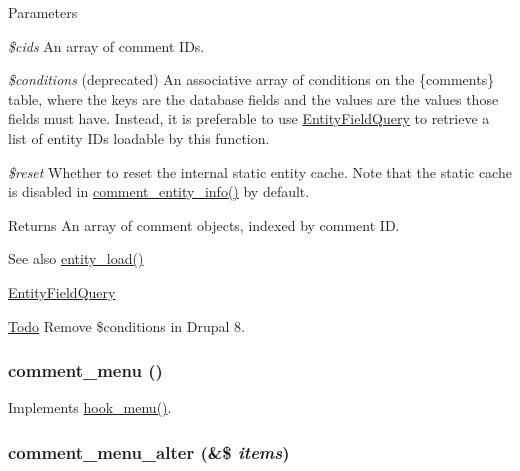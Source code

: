 \begin{DoxyParams}{Parameters}
\item[{\em \$cids}]An array of comment IDs. \item[{\em \$conditions}](deprecated) An associative array of conditions on the \{comments\} table, where the keys are the database fields and the values are the values those fields must have. Instead, it is preferable to use \hyperlink{classEntityFieldQuery}{EntityFieldQuery} to retrieve a list of entity IDs loadable by this function. \item[{\em \$reset}]Whether to reset the internal static entity cache. Note that the static cache is disabled in \hyperlink{comment_8module_a4cdb7636ced52ebf5d0af7dd42ca83d1}{comment\_\-entity\_\-info()} by default.\end{DoxyParams}
\begin{DoxyReturn}{Returns}
An array of comment objects, indexed by comment ID.
\end{DoxyReturn}
\begin{DoxySeeAlso}{See also}
\hyperlink{common_8inc_a78b89cf93f9710a68d02f86adccf1898}{entity\_\-load()} 

\hyperlink{classEntityFieldQuery}{EntityFieldQuery}
\end{DoxySeeAlso}
\begin{Desc}
\item[\hyperlink{todo__todo000014}{Todo}]Remove \$conditions in Drupal 8. \end{Desc}
\hypertarget{comment_8module_a94a9be33c58ee31519a160b07d52d4d0}{
\subsubsection[{comment\_\-menu}]{\setlength{\rightskip}{0pt plus 5cm}comment\_\-menu ()}}
\label{comment_8module_a94a9be33c58ee31519a160b07d52d4d0}
Implements \hyperlink{group__hooks_ga5c95244fea59b25666e409759e133ded}{hook\_\-menu()}. \hypertarget{comment_8module_a8ba809cd66487e3390673abf3fde59a9}{
\subsubsection[{comment\_\-menu\_\-alter}]{\setlength{\rightskip}{0pt plus 5cm}comment\_\-menu\_\-alter (\&\$ {\em items})}}
